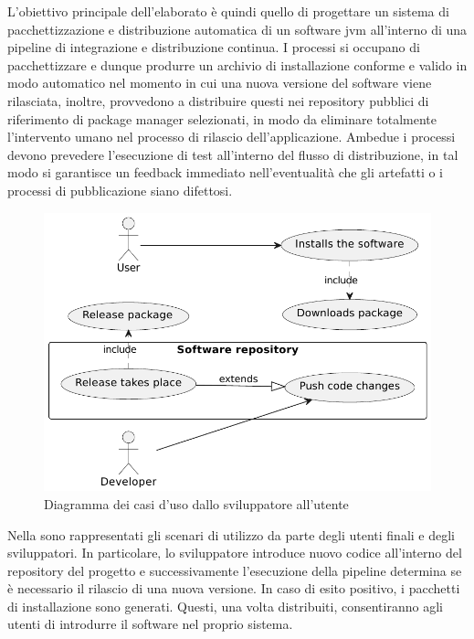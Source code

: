 L'obiettivo principale dell'elaborato è quindi quello di progettare un sistema di pacchettizzazione e distribuzione automatica di un software \ac{jvm} all'interno di una pipeline di integrazione e distribuzione continua. I processi si occupano di pacchettizzare e dunque produrre un archivio di installazione conforme e valido in modo automatico nel momento in cui una nuova versione del software viene rilasciata, inoltre, provvedono a distribuire questi nei repository pubblici di riferimento di package manager selezionati, in modo da eliminare totalmente l'intervento umano nel processo di rilascio dell'applicazione. Ambedue i processi devono prevedere l'esecuzione di test all'interno del flusso di distribuzione, in tal modo si garantisce un feedback immediato nell'eventualità che gli artefatti o i processi di pubblicazione siano difettosi.
\begin{figure}[htb]
	\centering
	\includegraphics[width=.75\linewidth]{figures/use-case-diagram.pdf}
	\caption{Diagramma dei casi d'uso dallo sviluppatore all'utente}
	\label{fig:use-case-diagram}
\end{figure}
Nella  sono rappresentati gli scenari di utilizzo da parte degli utenti finali e degli sviluppatori. In particolare, lo sviluppatore introduce nuovo codice all'interno del repository del progetto e successivamente l'esecuzione della pipeline determina se è necessario il rilascio di una nuova versione. In caso di esito positivo, i pacchetti di installazione sono generati. Questi, una volta distribuiti, consentiranno agli utenti di introdurre il software nel proprio sistema.